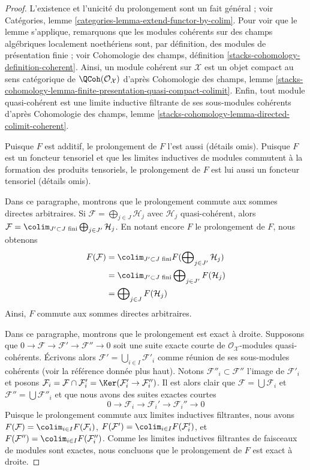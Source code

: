 \begin{proof}
L'existence et l'unicité du prolongement sont un fait général ; voir
Catégories, lemme \ref{categories-lemma-extend-functor-by-colim}.
Pour voir que le lemme s'applique, remarquons que les modules cohérents sur des
champs algébriques localement noethériens sont, par définition, des modules
de présentation finie ; voir
Cohomologie des champs, définition \ref{stacks-cohomology-definition-coherent}.
Ainsi, un module cohérent sur $\mathcal{X}$ est un
objet compact au sens catégorique de $\QCoh(\mathcal{O}_\mathcal{X})$ d'après
Cohomologie des champs, lemme
\ref{stacks-cohomology-lemma-finite-presentation-quasi-compact-colimit}.
Enfin, tout module quasi-cohérent est une limite inductive filtrante de
ses sous-modules cohérents d'après Cohomologie des champs, lemme
\ref{stacks-cohomology-lemma-directed-colimit-coherent}.

\medskip\noindent
Puisque $F$ est additif, le prolongement de $F$ l'est aussi (détails omis).
Puisque $F$ est un foncteur tensoriel et que les limites inductives de modules
commutent à la formation des produits tensoriels, le prolongement de $F$
est lui aussi un foncteur tensoriel (détails omis).

\medskip\noindent
Dans ce paragraphe, montrons que le prolongement commute aux sommes directes
arbitraires. Si $\mathcal{F} = \bigoplus_{j \in J} \mathcal{H}_j$
avec $\mathcal{H}_j$ quasi-cohérent, alors
$\mathcal{F} = \colim_{J' \subset J\text{ fini}}
\bigoplus_{j \in J'} \mathcal{H}_j$.
En notant encore $F$ le prolongement de $F$, nous obtenons
\begin{align*}
F(\mathcal{F})
& =
\colim_{J' \subset J\text{ fini}}
F(\bigoplus\nolimits_{j \in J'} \mathcal{H}_j) \\
& =
\colim_{J' \subset J\text{ fini}}
\bigoplus\nolimits_{j \in J'} F(\mathcal{H}_j) \\
& =
\bigoplus\nolimits_{j \in J} F(\mathcal{H}_j)
\end{align*}
Ainsi, $F$ commute aux sommes directes arbitraires.

\medskip\noindent
Dans ce paragraphe, montrons que le prolongement est exact à droite.
Supposons que $0 \to \mathcal{F} \to \mathcal{F}' \to \mathcal{F}'' \to 0$
soit une suite exacte courte de $\mathcal{O}_\mathcal{X}$-modules quasi-cohérents.
Écrivons alors $\mathcal{F}' = \bigcup_{i \in I} \mathcal{F}'_i$ comme
réunion de ses sous-modules cohérents (voir la référence donnée plus haut).
Notons $\mathcal{F}''_i \subset \mathcal{F}''$ l'image de $\mathcal{F}'_i$
et posons $\mathcal{F}_i = \mathcal{F} \cap \mathcal{F}'_i =
\Ker(\mathcal{F}'_i \to \mathcal{F}''_i)$. Il est alors clair que
$\mathcal{F} = \bigcup \mathcal{F}_i$ et
$\mathcal{F}'' = \bigcup \mathcal{F}''_i$
et que nous avons des suites exactes courtes
$$
0 \to \mathcal{F}_i \to \mathcal{F}_i' \to \mathcal{F}_i'' \to 0
$$
Puisque le prolongement commute aux limites inductives filtrantes, nous avons
$F(\mathcal{F}) = \colim_{i \in I} F(\mathcal{F}_i)$,
$F(\mathcal{F}') = \colim_{i \in I} F(\mathcal{F}'_i)$, et
$F(\mathcal{F}'') = \colim_{i \in I} F(\mathcal{F}''_i)$.
Comme les limites inductives filtrantes de faisceaux de modules sont exactes, nous
concluons que le prolongement de $F$ est exact à droite.


\end{proof}
